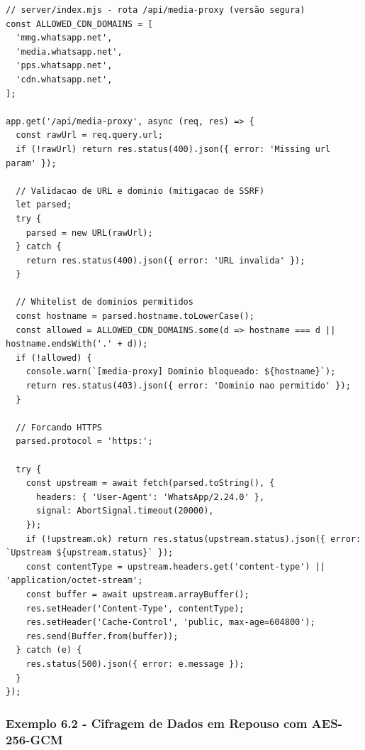 \documentclass[11pt, a4paper]{article}
\begin{document}
\begin{Verbatim}[fontsize=\small,frame=single,framesep=3pt]
// server/index.mjs - rota /api/media-proxy (versão segura)
const ALLOWED_CDN_DOMAINS = [
  'mmg.whatsapp.net',
  'media.whatsapp.net',
  'pps.whatsapp.net',
  'cdn.whatsapp.net',
];

app.get('/api/media-proxy', async (req, res) => {
  const rawUrl = req.query.url;
  if (!rawUrl) return res.status(400).json({ error: 'Missing url param' });

  // Validacao de URL e dominio (mitigacao de SSRF)
  let parsed;
  try {
    parsed = new URL(rawUrl);
  } catch {
    return res.status(400).json({ error: 'URL invalida' });
  }

  // Whitelist de dominios permitidos
  const hostname = parsed.hostname.toLowerCase();
  const allowed = ALLOWED_CDN_DOMAINS.some(d => hostname === d || hostname.endsWith('.' + d));
  if (!allowed) {
    console.warn(`[media-proxy] Dominio bloqueado: ${hostname}`);
    return res.status(403).json({ error: 'Dominio nao permitido' });
  }

  // Forcando HTTPS
  parsed.protocol = 'https:';

  try {
    const upstream = await fetch(parsed.toString(), {
      headers: { 'User-Agent': 'WhatsApp/2.24.0' },
      signal: AbortSignal.timeout(20000),
    });
    if (!upstream.ok) return res.status(upstream.status).json({ error: `Upstream ${upstream.status}` });
    const contentType = upstream.headers.get('content-type') || 'application/octet-stream';
    const buffer = await upstream.arrayBuffer();
    res.setHeader('Content-Type', contentType);
    res.setHeader('Cache-Control', 'public, max-age=604800');
    res.send(Buffer.from(buffer));
  } catch (e) {
    res.status(500).json({ error: e.message });
  }
});
\end{Verbatim}

\subsubsection{Exemplo 6.2 - Cifragem de Dados em Repouso com AES-256-GCM}
\end{document}
